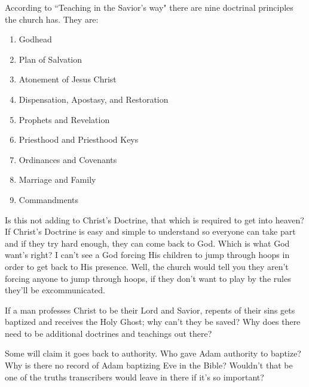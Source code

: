 According to ``Teaching in the Savior's way" there are nine doctrinal principles the
church has. They are:

\begin{enumerate}
  \item Godhead
  \item Plan of Salvation
  \item Atonement of Jesus Christ
  \item Dispensation, Apostasy, and Restoration
  \item Prophets and Revelation
  \item Priesthood and Priesthood Keys
  \item Ordinances and Covenants
  \item Marriage and Family
  \item Commandments
\end{enumerate}

Is this not adding to Christ's Doctrine, that which is required to get into heaven?
If Christ's Doctrine is easy and simple to understand so everyone can take part and
if they try hard enough, they can come back to God. Which is what God want's right? I
can't see a God forcing His children to jump through hoops in order to get back to
His presence. Well, the church would tell you they aren't forcing anyone to jump
through hoops, if they don't want to play by the rules they'll be excommunicated.

If a man professes Christ to be their Lord and Savior, repents of their sins gets 
baptized and receives the Holy Ghost; why can't they be saved? Why does there need to
be additional doctrines and teachings out there?

Some will claim it goes back to authority. Who gave Adam authority to baptize? Why is
there no record of Adam baptizing Eve in the Bible? Wouldn't that be one of the
truths transcribers would leave in there if it's so important?